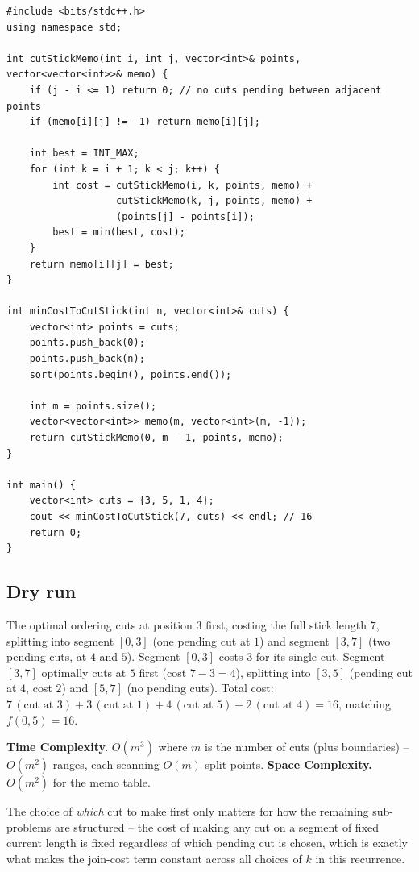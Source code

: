 \begin{lstlisting}
#include <bits/stdc++.h>
using namespace std;

int cutStickMemo(int i, int j, vector<int>& points, vector<vector<int>>& memo) {
    if (j - i <= 1) return 0; // no cuts pending between adjacent points
    if (memo[i][j] != -1) return memo[i][j];

    int best = INT_MAX;
    for (int k = i + 1; k < j; k++) {
        int cost = cutStickMemo(i, k, points, memo) +
                   cutStickMemo(k, j, points, memo) +
                   (points[j] - points[i]);
        best = min(best, cost);
    }
    return memo[i][j] = best;
}

int minCostToCutStick(int n, vector<int>& cuts) {
    vector<int> points = cuts;
    points.push_back(0);
    points.push_back(n);
    sort(points.begin(), points.end());

    int m = points.size();
    vector<vector<int>> memo(m, vector<int>(m, -1));
    return cutStickMemo(0, m - 1, points, memo);
}

int main() {
    vector<int> cuts = {3, 5, 1, 4};
    cout << minCostToCutStick(7, cuts) << endl; // 16
    return 0;
}
\end{lstlisting}

\subsection*{Dry run}


The optimal ordering cuts at position $3$ first, costing the full
stick length $7$, splitting into segment $[0,3]$ (one pending cut at
$1$) and segment $[3,7]$ (two pending cuts, at $4$ and $5$). Segment
$[0,3]$ costs $3$ for its single cut. Segment $[3,7]$ optimally cuts at
$5$ first (cost $7-3=4$), splitting into $[3,5]$ (pending cut at $4$,
cost $2$) and $[5,7]$ (no pending cuts). Total cost:
$7 \,(\text{cut at }3) + 3\,(\text{cut at }1) + 4\,(\text{cut at }5) +
2\,(\text{cut at }4) = 16$, matching $f(0,5)=16$.

\begin{complexitybox}
\textbf{Time Complexity.} $O(m^3)$ where $m$ is the number of cuts
(plus boundaries) -- $O(m^2)$ ranges, each scanning $O(m)$ split
points.
\textbf{Space Complexity.} $O(m^2)$ for the memo table.
\end{complexitybox}

\begin{takeawaybox}
The choice of \emph{which} cut to make first only matters for how the
remaining sub-problems are structured -- the cost of making any cut on
a segment of fixed current length is fixed regardless of which pending
cut is chosen, which is exactly what makes the join-cost term constant
across all choices of $k$ in this recurrence.
\end{takeawaybox}

